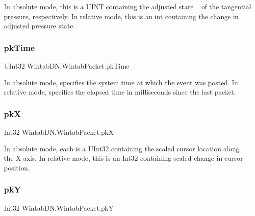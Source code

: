 In absolute mode, this is a U\+I\+NT containing the adjusted state ~\newline
of the tangential pressure, respectively. In relative mode, this is an int containing the change in adjusted pressure state. 

\mbox{\label{struct_wintab_d_n_1_1_wintab_packet_a9296716584867a40acdc50f831ecb68c}} 
\subsubsection{\texorpdfstring{pk\+Time}{pkTime}}
{\footnotesize\ttfamily U\+Int32 Wintab\+D\+N.\+Wintab\+Packet.\+pk\+Time}



In absolute mode, specifies the system time at which the event was posted. In relative mode, specifies the elapsed time in milliseconds since the last packet. 

\mbox{\label{struct_wintab_d_n_1_1_wintab_packet_abc78995c3ee22fc3203a0b78eb2ed771}} 
\subsubsection{\texorpdfstring{pkX}{pkX}}
{\footnotesize\ttfamily Int32 Wintab\+D\+N.\+Wintab\+Packet.\+pkX}



In absolute mode, each is a U\+Int32 containing the scaled cursor location along the X axis. In relative mode, this is an Int32 containing scaled change in cursor position. 

\mbox{\label{struct_wintab_d_n_1_1_wintab_packet_a81cedb6973cd5298fe65d36f3e16d792}} 
\subsubsection{\texorpdfstring{pkY}{pkY}}
{\footnotesize\ttfamily Int32 Wintab\+D\+N.\+Wintab\+Packet.\+pkY}



